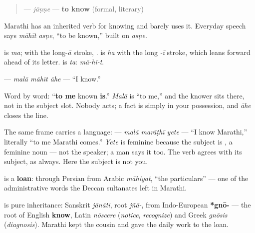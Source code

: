 \begin{quote}
\textbf{} — \emph{jāṇṇe} — \textbf{to know} (formal, literary)
\end{quote}

Marathi has an inherited verb for knowing and barely uses it. Everyday speech says \emph{māhīt asṇe}, \textquotedblleft{}to be known,\textquotedblright{} built on \emph{asṇe}.

\begin{sounds}
\textbf{} is \emph{ma}; with the long-\emph{ā} stroke, \textbf{}. \textbf{} is \textbf{} \emph{ha} with the long \emph{-ī} stroke, which leans forward ahead of its letter. \textbf{} is \emph{ta}: \emph{mā-hī-t}.
\end{sounds}

\begin{grammarlens}[title={Grammar Lens: knowledge comes to you, you do not do it}]
\textbf{  } — \emph{malā māhīt āhe} — \textquotedblleft{}I know.\textquotedblright{}

Word by word: \textquotedblleft{}\textbf{to me} known \textbf{is}.\textquotedblright{} \emph{Malā} is \textquotedblleft{}to me,\textquotedblright{} and the knower sits there, not in the subject slot. Nobody acts; a fact is simply in your possession, and \emph{āhe} closes the line.

The same frame carries a language: \textbf{  } — \emph{malā marāṭhī yete} — \textquotedblleft{}I know Marathi,\textquotedblright{} literally \textquotedblleft{}to me Marathi comes.\textquotedblright{} \emph{Yete} is feminine because the subject is \textbf{}, a feminine noun — not the speaker; a man says it too. The verb agrees with its subject, as always. Here the subject is not you.
\end{grammarlens}

\begin{cousinweb}
\textbf{} is a \textbf{loan}: through Persian from Arabic \emph{māhiyat}, \textquotedblleft{}the particulars\textquotedblright{} — one of the administrative words the Deccan sultanates left in Marathi.

\textbf{} is pure inheritance: Sanskrit \textbf{} \emph{jānāti}, root \emph{jñā-}, from Indo-European \textbf{*gnō-} — the root of English \textbf{know}, Latin \emph{nōscere} (\emph{notice}, \emph{recognize}) and Greek \emph{gnōsis} (\emph{diagnosis}). Marathi kept the cousin and gave the daily work to the loan.
\end{cousinweb}

